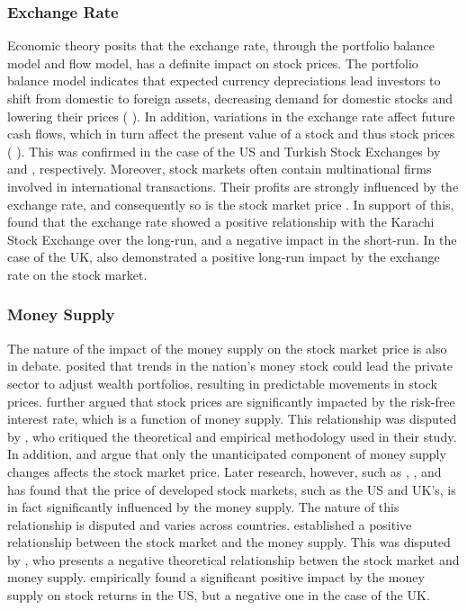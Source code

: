 \documentclass[11pt,a4paper]{article}
\newcommand{\citeboth}[1]{\citeauthor{#1} \citep{#1}}
\begin{document}
\subsubsection{Exchange Rate}

Economic theory posits that the exchange rate, through the portfolio 
balance model and flow model, has a definite impact on stock prices. The portfolio balance model indicates that expected currency depreciations lead investors to shift from domestic to foreign assets, decreasing demand for domestic stocks and lowering their prices (\citeboth{branson1977}). 
In addition, variations in the exchange rate affect future cash flows, which in turn affect the present value of a stock and thus stock prices (\citeboth{dornbusch1980}).
This was confirmed
in the case of the US and Turkish Stock Exchanges by \citeboth{aggarwal1981} and \citeboth{aydemir2009}, respectively. 
Moreover, stock markets often contain multinational firms involved in international transactions. Their profits are strongly influenced by the exchange rate, and consequently so is the stock market price \citep{Wong2018}.
In support of this, \citeboth{khan2018} found that the exchange rate showed a positive relationship with the Karachi Stock Exchange over the long-run, and a negative impact in the short-run. 
In the case of the UK, \citeboth{wong2022} also demonstrated a positive long-run impact by the exchange rate on the stock market.

\subsubsection{Money Supply}

The nature of the impact of the money supply on the stock market price is also 
in debate. \citeboth{palmer1970} posited that trends in the nation's money stock could lead the 
private sector to adjust wealth portfolios, resulting in 
predictable movements in stock prices. \citeboth{homa1971} further argued that 
stock prices are significantly impacted by the risk-free interest rate, 
which is a function of money supply. This relationship was disputed by \citeboth{pesando1974}, 
who critiqued the theoretical and empirical methodology used in their study. In addition, \citeboth{sorensen1982} and 
\citeboth{bernanke2005} argue that only the unanticipated component of money supply changes 
affects the stock market price. Later research, however, such as \citeboth{bahloul2017}, 
\citeboth{synek2024}, and \citeboth{pícha2017} has found that the price of developed stock markets, such as the US and UK's, is in fact significantly influenced by the money supply. 
The nature of this relationship is disputed and varies across countries. \citeboth{homa1971} established a positive relationship between the 
stock market and the money supply. This was disputed by \citeboth{sellin2001}, who presents a negative theoretical relationship betwen the stock market and money supply. \citeboth{olawale2014} empirically found a significant positive impact by the money supply on stock returns in the US, but a negative one in the case of the UK. 
\end{document}
